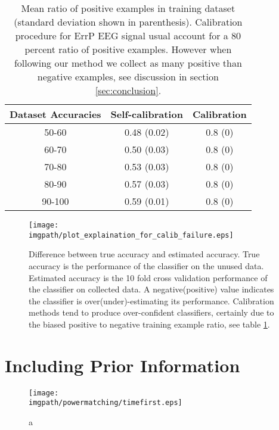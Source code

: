 \begin{table}
\centering
\begin{tabular}{c c c}
Dataset Accuracies & Self-calibration & Calibration \\ \hline
50-60 & 0.48 (0.02) & 0.8 (0) \\
60-70 & 0.50 (0.03) & 0.8 (0) \\
70-80 & 0.53 (0.03) & 0.8 (0) \\
80-90 & 0.57 (0.03) & 0.8 (0) \\
90-100 & 0.59 (0.01) & 0.8 (0) \\
\end{tabular}
\caption{Mean ratio of positive examples in training dataset (standard deviation shown in parenthesis). Calibration procedure for ErrP EEG signal usual account for a 80 percent ratio of positive examples. However when following our method we collect as many positive than negative examples, see discussion in section \ref{sec:conclusion}.}
\label{tab:correctLabelRatio}
\end{table}

\begin{figure}[!ht]
\centering
\texttt{[image: \\imgpath/plot\_explaination\_for\_calib\_failure.eps]}
\caption{Difference between true accuracy and estimated accuracy. True accuracy is the performance of the classifier on the unused data. Estimated accuracy is the 10 fold cross validation performance of the classifier on collected data. A negative(positive) value indicates the classifier is over(under)-estimating its performance. Calibration methods tend to produce over-confident classifiers, certainly due to the biased positive to negative training example ratio, see table \ref{tab:correctLabelRatio}.}
\label{fig:calibFail}
\end{figure}

\section{Including Prior Information}

\begin{figure}[!ht]
\centering
\texttt{[image: \\imgpath/powermatching/timefirst.eps]}
\caption{a}
\label{fig:timefirst_powermatching}
\end{figure} 

